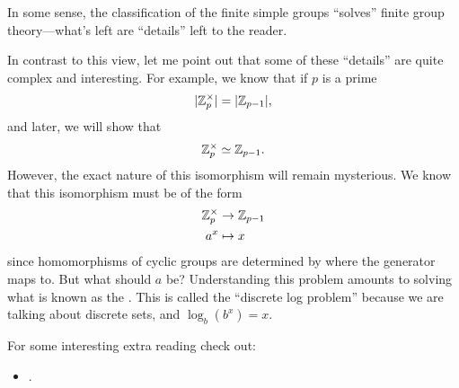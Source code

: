 \documentclass{ximera}
\begin{document}
In some sense, the classification of the finite simple groups
``solves'' finite group theory---what's left are ``details'' left to
the reader.

In contrast to this view, let me point out that some of these
``details'' are quite complex and interesting. For example, we know
that if $p$ is a prime
\[
| \mathbb Z_p^\times|=|\mathbb Z_{p-1}|,
\]
and later, we will show that
\[
\mathbb Z_p^\times \simeq \mathbb Z_{p-1}.
\]
However, the exact nature of this isomorphism will remain
mysterious. We know that this isomorphism must be of the form
\begin{align*}
  \mathbb Z_p^\times &\to\mathbb Z_{p-1} \\
  a^x &\mapsto x
\end{align*}
since homomorphisms of cyclic groups are determined by where the
generator maps to. But what should $a$ be?  Understanding this problem
amounts to solving what is known as the . This is called the ``discrete log problem'' because we are talking about discrete sets, and 
$\log_b(b^x) = x$.








For some interesting extra reading check out:
\begin{itemize}
\item {}.


\end{itemize}
\end{document}
